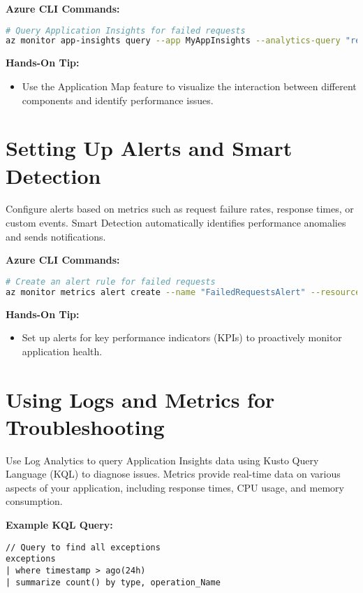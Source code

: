\documentclass{article}
\begin{document}
\textbf{Azure CLI Commands:}
\begin{lstlisting}[language=bash]
# Query Application Insights for failed requests
az monitor app-insights query --app MyAppInsights --analytics-query "requests | where success == false"
\end{lstlisting}

\textbf{Hands-On Tip:}
\begin{itemize}
    \item Use the Application Map feature to visualize the interaction between different components and identify performance issues.
\end{itemize}

\section{Setting Up Alerts and Smart Detection}
Configure alerts based on metrics such as request failure rates, response times, or custom events. Smart Detection automatically identifies performance anomalies and sends notifications.

\textbf{Azure CLI Commands:}
\begin{lstlisting}[language=bash]
# Create an alert rule for failed requests
az monitor metrics alert create --name "FailedRequestsAlert" --resource-group MyResourceGroup --scopes /subscriptions/<subscription-id>/resourceGroups/MyResourceGroup/providers/Microsoft.Insights/components/MyAppInsights --condition "requests/count gt 10" --description "Alert for high failure rates"
\end{lstlisting}

\textbf{Hands-On Tip:}
\begin{itemize}
    \item Set up alerts for key performance indicators (KPIs) to proactively monitor application health.
\end{itemize}

\section{Using Logs and Metrics for Troubleshooting}
Use Log Analytics to query Application Insights data using Kusto Query Language (KQL) to diagnose issues. Metrics provide real-time data on various aspects of your application, including response times, CPU usage, and memory consumption.

\textbf{Example KQL Query:}
\begin{lstlisting}
// Query to find all exceptions
exceptions
| where timestamp > ago(24h)
| summarize count() by type, operation_Name
\end{lstlisting}
\end{document}
